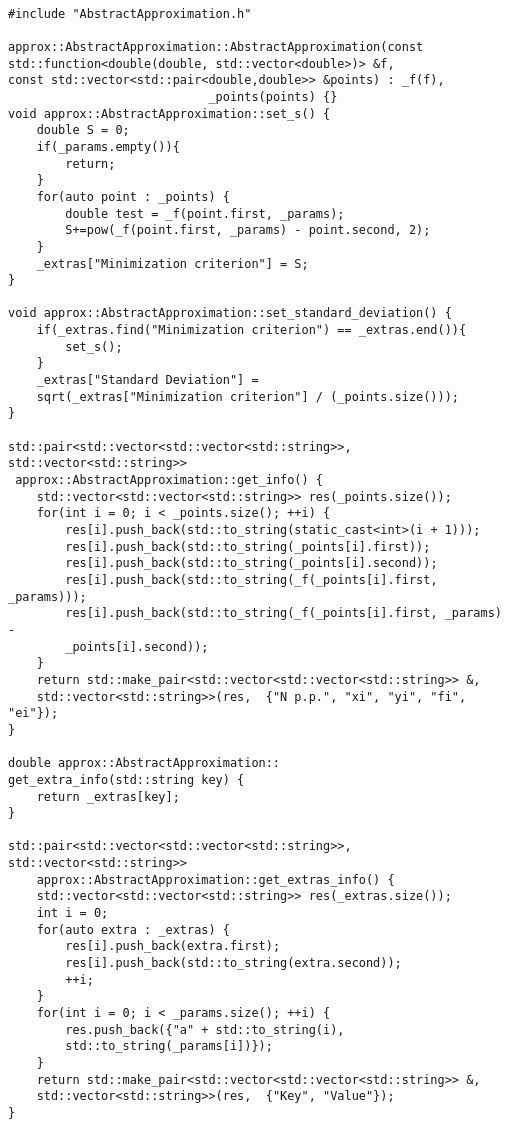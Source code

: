 \begin{lstlisting}

#include "AbstractApproximation.h"

approx::AbstractApproximation::AbstractApproximation(const 
std::function<double(double, std::vector<double>)> &f,
const std::vector<std::pair<double,double>> &points) : _f(f),
                            _points(points) {}
void approx::AbstractApproximation::set_s() {
    double S = 0;
    if(_params.empty()){
        return;
    }
    for(auto point : _points) {
        double test = _f(point.first, _params);
        S+=pow(_f(point.first, _params) - point.second, 2);
    }
    _extras["Minimization criterion"] = S;
}

void approx::AbstractApproximation::set_standard_deviation() {
    if(_extras.find("Minimization criterion") == _extras.end()){
        set_s();
    }
    _extras["Standard Deviation"] =
    sqrt(_extras["Minimization criterion"] / (_points.size()));
}

std::pair<std::vector<std::vector<std::string>>,
std::vector<std::string>>
 approx::AbstractApproximation::get_info() {
    std::vector<std::vector<std::string>> res(_points.size());
    for(int i = 0; i < _points.size(); ++i) {
        res[i].push_back(std::to_string(static_cast<int>(i + 1)));
        res[i].push_back(std::to_string(_points[i].first));
        res[i].push_back(std::to_string(_points[i].second));
        res[i].push_back(std::to_string(_f(_points[i].first, _params)));
        res[i].push_back(std::to_string(_f(_points[i].first, _params) -
        _points[i].second));
    }
    return std::make_pair<std::vector<std::vector<std::string>> &,
    std::vector<std::string>>(res,  {"N p.p.", "xi", "yi", "fi", "ei"});
}

double approx::AbstractApproximation::
get_extra_info(std::string key) {
    return _extras[key];
}

std::pair<std::vector<std::vector<std::string>>,
std::vector<std::string>>
    approx::AbstractApproximation::get_extras_info() {
    std::vector<std::vector<std::string>> res(_extras.size());
    int i = 0;
    for(auto extra : _extras) {
        res[i].push_back(extra.first);
        res[i].push_back(std::to_string(extra.second));
        ++i;
    }
    for(int i = 0; i < _params.size(); ++i) {
        res.push_back({"a" + std::to_string(i), 
        std::to_string(_params[i])});
    }
    return std::make_pair<std::vector<std::vector<std::string>> &,
    std::vector<std::string>>(res,  {"Key", "Value"});
}


\end{lstlisting}
